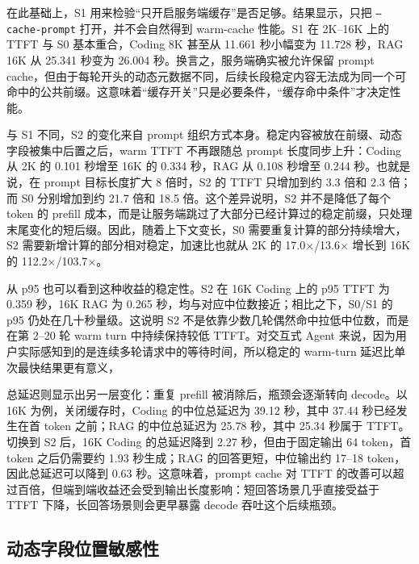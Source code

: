 \documentclass[10pt]{article}
\begin{document}
在此基础上，S1 用来检验“只开启服务端缓存”是否足够。结果显示，只把 \texttt{--cache-prompt} 打开，并不会自然得到 warm-cache 性能。S1 在 2K--16K 上的 TTFT 与 S0 基本重合，Coding 8K 甚至从 11.661 秒小幅变为 11.728 秒，RAG 16K 从 25.341 秒变为 26.004 秒。换言之，服务端确实被允许保留 prompt cache，但由于每轮开头的动态元数据不同，后续长段稳定内容无法成为同一个可命中的公共前缀。这意味着“缓存开关”只是必要条件，“缓存命中条件”才决定性能。

与 S1 不同，S2 的变化来自 prompt 组织方式本身。稳定内容被放在前缀、动态字段被集中后置之后，warm TTFT 不再跟随总 prompt 长度同步上升：Coding 从 2K 的 0.101 秒增至 16K 的 0.334 秒，RAG 从 0.108 秒增至 0.244 秒。也就是说，在 prompt 目标长度扩大 8 倍时，S2 的 TTFT 只增加到约 3.3 倍和 2.3 倍；而 S0 分别增加到约 21.7 倍和 18.5 倍。这个差异说明，S2 并不是降低了每个 token 的 prefill 成本，而是让服务端跳过了大部分已经计算过的稳定前缀，只处理末尾变化的短后缀。因此，随着上下文变长，S0 需要重复计算的部分持续增大，S2 需要新增计算的部分相对稳定，加速比也就从 2K 的 17.0$\times$/13.6$\times$ 增长到 16K 的 112.2$\times$/103.7$\times$。

从 p95 也可以看到这种收益的稳定性。S2 在 16K Coding 上的 p95 TTFT 为 0.359 秒，16K RAG 为 0.265 秒，均与对应中位数接近；相比之下，S0/S1 的 p95 仍处在几十秒量级。这说明 S2 不是依靠少数几轮偶然命中拉低中位数，而是在第 2--20 轮 warm turn 中持续保持较低 TTFT。对交互式 Agent 来说，因为用户实际感知到的是连续多轮请求中的等待时间，所以稳定的 warm-turn 延迟比单次最快结果更有意义，

总延迟则显示出另一层变化：重复 prefill 被消除后，瓶颈会逐渐转向 decode。以 16K 为例，关闭缓存时，Coding 的中位总延迟为 39.12 秒，其中 37.44 秒已经发生在首 token 之前；RAG 的中位总延迟为 25.78 秒，其中 25.34 秒属于 TTFT。切换到 S2 后，16K Coding 的总延迟降到 2.27 秒，但由于固定输出 64 token，首 token 之后仍需要约 1.93 秒生成；RAG 的回答更短，中位输出约 17--18 token，因此总延迟可以降到 0.63 秒。这意味着，prompt cache 对 TTFT 的改善可以超过百倍，但端到端收益还会受到输出长度影响：短回答场景几乎直接受益于 TTFT 下降，长回答场景则会更早暴露 decode 吞吐这个后续瓶颈。

\subsection{动态字段位置敏感性}
\label{sec:layout}
\end{document}
